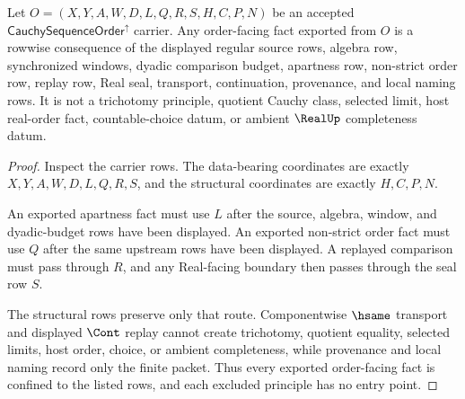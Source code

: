 \begin{theorem}
\label{thm:cauchy-sequence-order-nonescape}
Let $O=(X,Y,A,W,D,L,Q,R,S,H,C,P,N)$ be an accepted $\mathsf{CauchySequenceOrder}^{\uparrow}$ carrier. Any order-facing fact exported from $O$ is a rowwise consequence of the displayed regular source rows, algebra row, synchronized windows, dyadic comparison budget, apartness row, non-strict order row, replay row, Real seal, transport, continuation, provenance, and local naming rows. It is not a trichotomy principle, quotient Cauchy class, selected limit, host real-order fact, countable-choice datum, or ambient $\RealUp$ completeness datum.
\end{theorem}
\begin{proof}
Inspect the carrier rows. The data-bearing coordinates are exactly $X,Y,A,W,D,L,Q,R,S$, and the structural coordinates are exactly $H,C,P,N$.

An exported apartness fact must use $L$ after the source, algebra, window, and dyadic-budget rows have been displayed. An exported non-strict order fact must use $Q$ after the same upstream rows have been displayed. A replayed comparison must pass through $R$, and any Real-facing boundary then passes through the seal row $S$.

The structural rows preserve only that route. Componentwise $\hsame$ transport and displayed $\Cont$ replay cannot create trichotomy, quotient equality, selected limits, host order, choice, or ambient completeness, while provenance and local naming record only the finite packet. Thus every exported order-facing fact is confined to the listed rows, and each excluded principle has no entry point.
\end{proof}


